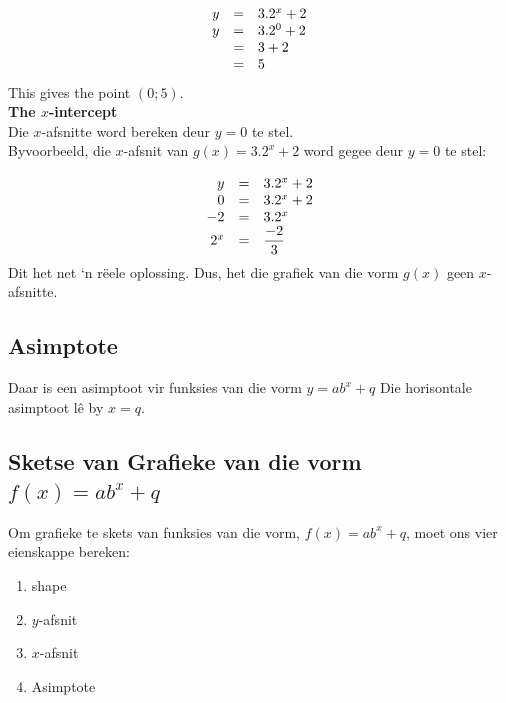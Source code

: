 \begin{equation*}
\begin{array}{ccl}\hfill y& =& 3.2^{x}+2\hfill \\
 \hfill y& =& 3.2^{0}+2\hfill \\
 & =& 3+2\hfill \\ & =& 5\hfill 
\end{array}
\end{equation*}
This gives the point $(0;5)$.\vspace{10pt}
\\
\textbf{The $x$-intercept}\\
Die $x$-afsnitte word bereken deur $y=0$ te stel. \\
Byvoorbeeld, die $x$-afsnit van $g(x)=3.2^{x}+2$ word gegee deur $y=0$ te stel:\par 
\begin{equation*}
\begin{array}{ccl}\hfill y& =& 3.2^{x}+2\hfill \\
 \hfill 0& =& 3.2^{x}+2\hfill \\
 \hfill -2& =& 3.2^{x}\hfill \\
 \hfill {2}^{x}& =& \dfrac{-2}{3}\hfill 
\end{array}
\end{equation*}
Dit het net ‘n rëele oplossing. Dus, het die grafiek van die vorm $g(x)$ geen $x$-afsnitte.\par 

\subsection*{Asimptote}

Daar is een asimptoot vir funksies van die vorm $y=ab^{x}+q$ Die horisontale asimptoot lê by $x=q$. 


\subsection*{Sketse van Grafieke van die vorm $f(x)=ab^{x}+q$}

Om grafieke te skets van funksies van die vorm, $f(x)=ab^{x}+q$, moet ons vier eienskappe bereken:\par 
\begin{enumerate}[noitemsep, label=\textbf{\arabic*}. ] 
\item shape
\item $y$-afsnit
\item $x$-afsnit
\item Asimptote
\end{enumerate}

